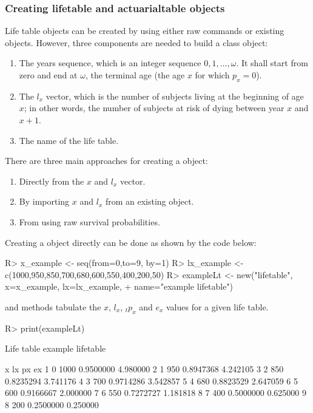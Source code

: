 \documentclass[nojss]{jss}
\begin{document}
\subsubsection{Creating lifetable and actuarialtable objects}\label{sss:creating}
Life table objects can be created by using either raw  commands or existing  objects.
However, three components are needed to build a  class object:
\begin{enumerate}
	\item The years sequence, which is an integer sequence $0,1,\ldots, \omega$. It shall 
	start from zero and end at $\omega$, the terminal age (the age $x$
	for which $p_x=0$).
	\item The $l_x$ vector, which is the number of subjects living at the beginning
	of age $x$; in other words, the number of subjects at risk of dying between year
	$x$ and $x+1$.
	\item The name of the life table.
\end{enumerate}

There are three main approaches for creating a  object:
\begin{enumerate}
	\item Directly from the $x$ and $l_x$ vector.
	\item By importing $x$ and $l_x$ from an existing  object.
	\item From using raw survival probabilities.
\end{enumerate}

Creating a  object directly can be done as shown by the code
below:

\begin{Schunk}
\begin{Sinput}
R> x_example <- seq(from=0,to=9, by=1)
R> lx_example <- c(1000,950,850,700,680,600,550,400,200,50)
R> exampleLt <- new("lifetable", x=x_example, lx=lx_example, 
+  		name="example lifetable")
\end{Sinput}
\end{Schunk}

 and   methods tabulate 
the $x$, $l_x$, ${}_{t}p_{x}$ and $e_x$ values for a given life table.


\begin{Schunk}
\begin{Sinput}
R> print(exampleLt)
\end{Sinput}
\begin{Soutput}
Life table example lifetable 

  x   lx        px       ex
1 0 1000 0.9500000 4.980000
2 1  950 0.8947368 4.242105
3 2  850 0.8235294 3.741176
4 3  700 0.9714286 3.542857
5 4  680 0.8823529 2.647059
6 5  600 0.9166667 2.000000
7 6  550 0.7272727 1.181818
8 7  400 0.5000000 0.625000
9 8  200 0.2500000 0.250000
\end{Soutput}
\end{Schunk}
\end{document}
